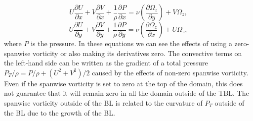 \begin{equation}\label{eq:RANS_x_BC_OMEGA}
    U \frac {\partial U} {\partial x} + V \frac {\partial V} {\partial x} +
      \frac {1} {\rho} \frac {\partial P} {\partial x} = 
      \nu \left( \frac {\partial \Omega_z} {\partial y} \right) + V \Omega_z,
\end{equation}
\begin{equation}\label{eq:RANS_Y_BC_OMEGA}
    U \frac {\partial U} {\partial y} + V \frac {\partial V} {\partial y} +
      \frac {1} {\rho} \frac {\partial P} {\partial y} = 
      \nu \left( \frac {\partial \Omega_z} {\partial x} \right) + U \Omega_z,
\end{equation}
where $P$ is the pressure. In these equations we can see the effects of using a zero-spanwise vorticity or also making its derivatives zero. The convective terms on the left-hand side can be written as the gradient of a total pressure   $P_T / \rho = P/\rho + (U^2+V^2)/2$ caused by the effects of non-zero spanwise vorticity. Even if the spanwise vorticity is set to zero at the top of the domain, this does not guarantee that it will remain zero in all the domain outside of the TBL.
The spanwise vorticity outside of the BL is related to the curvature of $P_T$ outside of the BL due to the growth of the BL.
